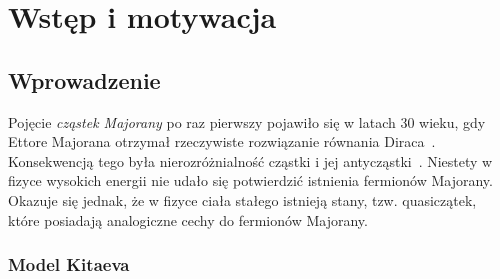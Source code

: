 \chapter{Wstęp i motywacja}

%

\section{Wprowadzenie}

Pojęcie {\it cząstek Majorany} po raz pierwszy pojawiło się  w latach 30  wieku, gdy Ettore Majorana otrzymał rzeczywiste rozwiązanie równania Diraca~\cite{dirac.1928}.
Konsekwencją tego była nierozróżnialność cząstki i jej antycząstki~\cite{majorana.1937}.
Niestety w fizyce wysokich energii nie udało się potwierdzić istnienia fermionów Majorany.
Okazuje się jednak, że w fizyce ciała stałego istnieją stany, tzw. quasiczątek, które posiadają analogiczne cechy do fermionów Majorany. 

\subsection*{Model Kitaeva}

